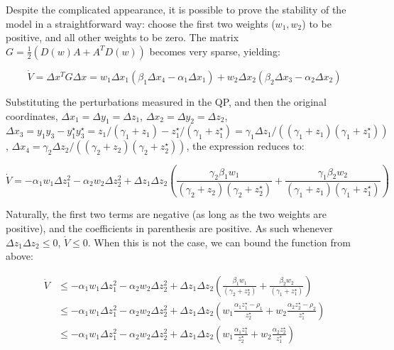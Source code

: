 \documentclass{article}
\begin{document}
Despite the complicated appearance, it is possible to prove the
stability of the model in a straightforward way: choose the first two
weights (\(w_1, w_2\)) to be positive, and all other weights to be zero.
The matrix \(G = \frac{1}{2}(D(w)A + A^T D(w))\) becomes very sparse,
yielding:

\begin{equation}
\dot{V} = \Delta x^T G \Delta x = w_1 \Delta x_1 (\beta_1 \Delta x_4 - \alpha_1 \Delta x_1) + w_2 \Delta x_2 (\beta_2 \Delta x_3 - \alpha_2 \Delta x_2)
\end{equation}

Substituting the perturbations measured in the QP, and then the original
coordinates, \(\Delta x_1 = \Delta y_1 = \Delta z_1\),
\(\Delta x_2 = \Delta y_2 = \Delta z_2\),
\(\Delta x_3 = y_1 y_3 - y_1^\star y_3^\star = z_1 / (\gamma_1 + z_1) - z_1^\star / (\gamma_1 + z_1^\star) = \gamma_1 \Delta z_1 / ((\gamma_1 + z_1) (\gamma_1 + z_1^\star))\),
\(\Delta x_4 = \gamma_2 \Delta z_2 / ((\gamma_2 + z_2) (\gamma_2 + z_2^\star))\),
the expression reduces to:

\begin{equation}
\dot{V} = - \alpha_1 w_1 \Delta z_1^2 - \alpha_2 w_2 \Delta z_2^2 + \Delta z_1 \Delta z_2 \left(\frac{\gamma_2 \beta_1 w_1}{(\gamma_2 +z_2)(\gamma_2 +z_2^\star)} + \frac{\gamma_1 \beta_2 w_2}{(\gamma_1 +z_1)(\gamma_1 +z_1^\star)} \right)
\end{equation}

Naturally, the first two terms are negative (as long as the two weights
are positive), and the coefficients in parenthesis are positive. As such
whenever \(\Delta z_1 \Delta z_2 \leq 0\), \(\dot{V} \leq 0\). When this
is not the case, we can bound the function from above:

\begin{equation}
\begin{aligned}
\dot{V} &\leq - \alpha_1 w_1 \Delta z_1^2 - \alpha_2 w_2 \Delta z_2^2 + \Delta z_1 \Delta z_2 \left(\frac{\beta_1 w_1}{(\gamma_2 +z_2^\star)} + \frac{\beta_2 w_2}{(\gamma_1 +z_1^\star)} \right)\\
&\leq - \alpha_1 w_1 \Delta z_1^2 - \alpha_2 w_2 \Delta z_2^2 + \Delta z_1 \Delta z_2 \left(w_1 \frac{\alpha_1 z_1^\star - \rho_1}{z_2^\star} + w_2 \frac{\alpha_2 z_2^\star- \rho_2}{z_1^\star} \right)\\
&\leq - \alpha_1 w_1 \Delta z_1^2 - \alpha_2 w_2 \Delta z_2^2 + \Delta z_1 \Delta z_2 \left(w_1 \frac{\alpha_1 z_1^\star}{z_2^\star} + w_2\frac{\alpha_2 z_2^\star}{z_1^\star} \right)
\end{aligned}
\end{equation}
\end{document}
